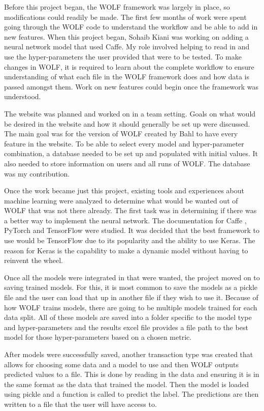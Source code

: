 Before this project began, the WOLF framework was largely in place, so modifications could readily be made. The first few months of work were spent going through the WOLF code to understand the workflow and be able to add in new features. When this project began, Sohaib Kiani was working on adding a neural network model that used Caffe. My role involved helping to read in and use the hyper-parameters the user provided that were to be tested. To make changes in WOLF, it is required to learn about the complete workflow to ensure understanding of what each file in the WOLF framework does and how data is passed amongst them. Work on new features could begin once the framework was understood.

The website was planned and worked on in a team setting. Goals on what would be desired in the website and how it should generally be set up were discussed. The main goal was for the version of WOLF created by Bahl \parencite{WOLFprojectreport} to have every feature in the website. To be able to select every model and hyper-parameter combination, a database needed to be set up and populated with initial values. It also needed to store information on users and all runs of WOLF. The database was my contribution.

Once the work became just this project, existing tools and experiences about machine learning were analyzed to determine what would be wanted out of WOLF that was not there already. The first task was in determining if there was a better way to implement the neural network. The documentation for Caffe \parencite{Caffe}, PyTorch \parencite{PyTorch} and TensorFlow \parencite{TensorFlow} were studied. It was decided that the best framework to use would be TensorFlow due to its popularity and the ability to use Keras. The reason for Keras is the capability to make a dynamic model without having to reinvent the wheel.

Once all the models were integrated in that were wanted, the project moved on to saving trained models. For this, it is most common to save the models as a pickle file and the user can load that up in another file if they wish to use it. Because of how WOLF trains models, there are going to be multiple models trained for each data split. All of these models are saved into a folder specific to the model type and hyper-parameters and the results excel file provides a file path to the best model for those hyper-parameters based on a chosen metric.

After models were successfully saved, another transaction type was created that allows for choosing some data and a model to use and then WOLF outputs predicted values to a file. This is done by reading in the data and ensuring it is in the same format as the data that trained the model. Then the model is loaded using pickle and a function is called to predict the label. The predictions are then written to a file that the user will have access to.

